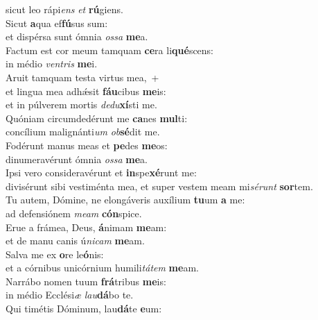 \oddverse sicut leo rápi\textit{ens} \textit{et} \textbf{rú}giens.\\
\evenverse Sicut \textbf{a}qua ef\textbf{fú}sus sum:~\*\\
\evenverse et dispérsa sunt ómnia \textit{os}\textit{sa} \textbf{me}a.\\
\oddverse Factum est cor meum tamquam \textbf{ce}ra li\textbf{qué}scens:~\*\\
\oddverse in médio \textit{ven}\textit{tris} \textbf{me}i.\\
\evenverse Aruit tamquam testa virtus mea,~+\\
\evenverse  et lingua mea adhǽsit \textbf{fáu}cibus \textbf{me}is:~\*\\
\evenverse et in púlverem mortis \textit{de}\textit{du}\textbf{xí}sti me.\\
\oddverse Quóniam circumdedérunt me \textbf{ca}nes \textbf{mul}ti:~\*\\
\oddverse concílium malignánti\textit{um} \textit{ob}\textbf{sé}dit me.\\
\evenverse Fodérunt manus meas et \textbf{pe}des \textbf{me}os:~\*\\
\evenverse dinumeravérunt ómnia \textit{os}\textit{sa} \textbf{me}a.\\
\oddverse Ipsi vero consideravérunt et \textbf{in}spe\textbf{xé}runt me:~\*\\
\oddverse divisérunt sibi vestiménta mea, et super vestem meam mi\textit{sé}\textit{runt} \textbf{sor}tem.\\
\evenverse Tu autem, Dómine, ne elongáveris auxílium \textbf{tu}um \textbf{a} me:~\*\\
\evenverse ad defensiónem \textit{me}\textit{am} \textbf{cón}spice.\\
\oddverse Erue a frámea, Deus, \textbf{á}nimam \textbf{me}am:~\*\\
\oddverse et de manu canis ú\textit{ni}\textit{cam} \textbf{me}am.\\
\evenverse Salva me ex \textbf{o}re le\textbf{ó}nis:~\*\\
\evenverse et a córnibus unicórnium humili\textit{tá}\textit{tem} \textbf{me}am.\\
\oddverse Narrábo nomen tuum \textbf{frá}tribus \textbf{me}is:~\*\\
\oddverse in médio Ecclési\textit{æ} \textit{lau}\textbf{dá}bo te.\\
\evenverse Qui timétis Dóminum, lau\textbf{dá}te \textbf{e}um:~\*\\
